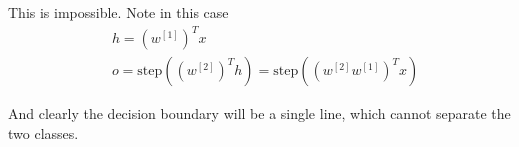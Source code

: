 \begin{answer}
    This is impossible. Note in this case
    $$
    \begin{aligned}
        &h = (w^{[1]})^T x\\
        &o = \text{step}((w^{[2]})^T h) = \text{step}((w^{[2]}w^{[1]})^T x)
    \end{aligned}
    $$

    And clearly the decision boundary will be a single line, which cannot separate the two classes.
    
\end{answer}
